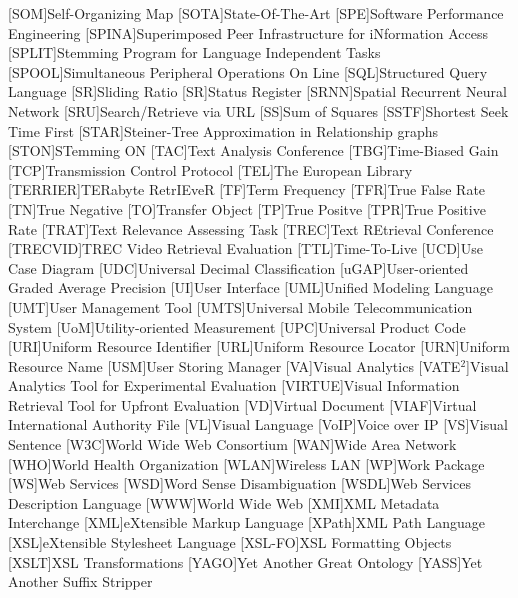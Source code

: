 [SOM]{Self-Organizing Map}
[SOTA]{State-Of-The-Art}
[SPE]{Software Performance Engineering}
[SPINA]{Superimposed Peer Infrastructure for iNformation Access}
[SPLIT]{Stemming Program for Language Independent Tasks}
[SPOOL]{Simultaneous Peripheral Operations On Line}
[SQL]{Structured Query Language}
[SR]{Sliding Ratio}
[SR]{Status Register}
[SRNN]{Spatial Recurrent Neural Network}
[SRU]{Search/Retrieve via \acs{URL}}
[SS]{Sum of Squares}
[SSTF]{Shortest Seek Time First}
[STAR]{Steiner-Tree Approximation in Relationship graphs}
[STON]{STemming ON}
[TAC]{Text Analysis Conference}
[TBG]{Time-Biased Gain}
[TCP]{Transmission Control Protocol}
[TEL]{The European Library}
[TERRIER]{TERabyte RetrIEveR}
[TF]{Term Frequency}
[TFR]{True False Rate}
[TN]{True Negative}
[TO]{Transfer Object}
[TP]{True Positve}
[TPR]{True Positive Rate}
[TRAT]{Text Relevance Assessing Task}
[TREC]{Text REtrieval Conference}
[TRECVID]{TREC Video Retrieval Evaluation}
[TTL]{Time-To-Live}
[UCD]{Use Case Diagram}
[UDC]{Universal Decimal Classification}
[uGAP]{User-oriented Graded Average Precision}
[UI]{User Interface}
[UML]{Unified Modeling Language}
[UMT]{User Management Tool}
[UMTS]{Universal Mobile Telecommunication System}
[UoM]{Utility-oriented Measurement}
[UPC]{Universal Product Code}
[URI]{Uniform Resource Identifier}
[URL]{Uniform Resource Locator}
[URN]{Uniform Resource Name}
[USM]{User Storing Manager}
[VA]{Visual Analytics}
[VATE$^2$]{Visual Analytics Tool for Experimental Evaluation}
[VIRTUE]{Visual Information Retrieval Tool for Upfront Evaluation}
[VD]{Virtual Document}
[VIAF]{Virtual International Authority File}
[VL]{Visual Language}
[VoIP]{Voice over IP}
[VS]{Visual Sentence}
[W3C]{World Wide Web Consortium}
[WAN]{Wide Area Network}
[WHO]{World Health Organization}
[WLAN]{Wireless \acs{LAN}}
[WP]{Work Package}
[WS]{Web Services}
[WSD]{Word Sense Disambiguation}
[WSDL]{Web Services Description Language}
[WWW]{World Wide Web}
[XMI]{\acs{XML} Metadata Interchange}
[XML]{eXtensible Markup Language}
[XPath]{XML Path Language}
[XSL]{eXtensible Stylesheet Language}
[XSL-FO]{\acs{XSL} Formatting Objects}
[XSLT]{\acs{XSL} Transformations}
[YAGO]{Yet Another Great Ontology}
[YASS]{Yet Another Suffix Stripper}
